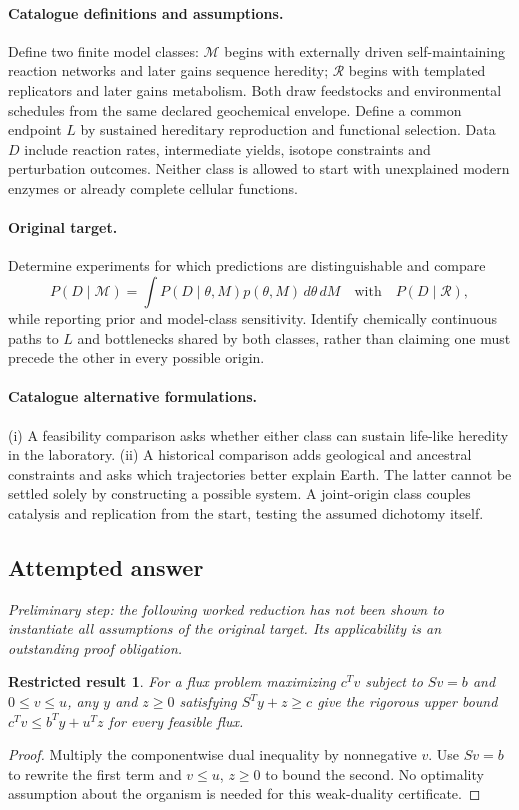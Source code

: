 \documentclass[11pt]{article}
\newtheorem{attemptresult}{Restricted result}[section]
\begin{document}
\paragraph{Catalogue definitions and assumptions.}
Define two finite model classes: $\mathcal M$ begins with externally driven self-maintaining reaction networks and later gains sequence heredity; $\mathcal R$ begins with templated replicators and later gains metabolism. Both draw feedstocks and environmental schedules from the same declared geochemical envelope. Define a common endpoint $L$ by sustained hereditary reproduction and functional selection. Data $D$ include reaction rates, intermediate yields, isotope constraints and perturbation outcomes. Neither class is allowed to start with unexplained modern enzymes or already complete cellular functions.
\paragraph{Original target.}
Determine experiments for which predictions are distinguishable and compare
\[
P(D\mid\mathcal M)=\int P(D\mid\theta,M)p(\theta,M)\,d\theta\,dM
\quad\text{with}\quad P(D\mid\mathcal R),
\]
while reporting prior and model-class sensitivity. Identify chemically continuous paths to $L$ and bottlenecks shared by both classes, rather than claiming one must precede the other in every possible origin.
\paragraph{Catalogue alternative formulations.}
(i) A feasibility comparison asks whether either class can sustain life-like heredity in the laboratory. (ii) A historical comparison adds geological and ancestral constraints and asks which trajectories better explain Earth. The latter cannot be settled solely by constructing a possible system. A joint-origin class couples catalysis and replication from the start, testing the assumed dichotomy itself.
\subsection{Attempted answer}
\noindent\emph{Preliminary step: the following worked reduction has not been shown to instantiate all assumptions of the original target. Its applicability is an outstanding proof obligation.}

\begin{attemptresult}
For a flux problem maximizing $c^Tv$ subject to $Sv=b$ and $0\leq v\leq u$, any $y$ and $z\geq0$ satisfying $S^Ty+z\geq c$ give the rigorous upper bound $c^Tv\leq b^Ty+u^Tz$ for every feasible flux.
\end{attemptresult}
\begin{proof}
Multiply the componentwise dual inequality by nonnegative $v$. Use $Sv=b$ to rewrite the first term and $v\leq u$, $z\geq0$ to bound the second. No optimality assumption about the organism is needed for this weak-duality certificate.
\end{proof}
\end{document}
